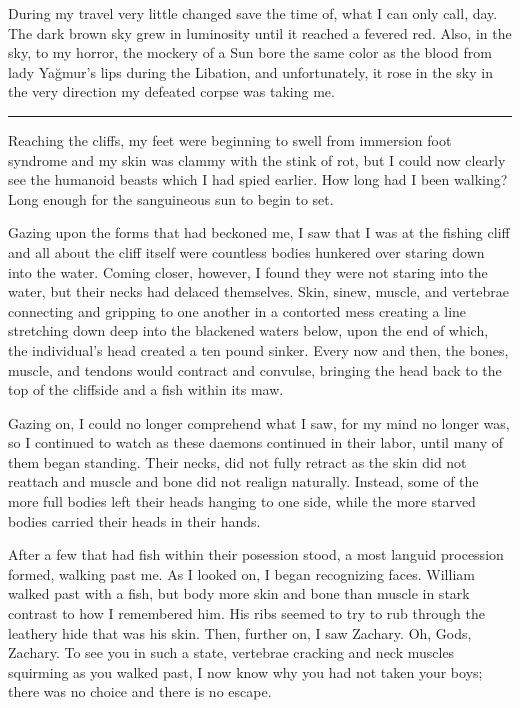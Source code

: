 During my travel very little changed save the time of, what I can only call, day. The dark
brown sky grew in luminosity until it reached a fevered red. Also, in the sky, to my horror, the
mockery of a Sun bore the same color as the blood from lady Yağmur's lips during the Libation, and
unfortunately, it rose in the sky in the very direction my defeated corpse was taking me.

\noindent\rule{\textwidth}{1pt}

Reaching the cliffs, my feet were beginning to swell from immersion foot syndrome and my skin was
clammy with the stink of rot, but I could now clearly see the humanoid beasts which I had spied
earlier. How long had I been walking? Long enough for the sanguineous sun to begin to set.

Gazing upon the forms that had beckoned me, I saw that I was at the fishing cliff and all about the
cliff itself were countless bodies hunkered over staring down into the water. Coming closer,
however, I found they were not staring into the water, but their necks had delaced themselves. Skin,
sinew, muscle, and vertebrae connecting and gripping to one another in a contorted mess creating a
line stretching down deep into the blackened waters below, upon the end of which, the individual's
head created a ten pound sinker. Every now and then, the bones, muscle, and tendons would contract
and convulse, bringing the head back to the top of the cliffside and a fish within its maw.

Gazing on, I could no longer comprehend what I saw, for my mind no longer was, so I continued to
watch as these daemons continued in their labor, until many of them began standing. Their necks, did
not fully retract as the skin did not reattach and muscle and bone did not realign naturally.
Instead, some of the more full bodies left their heads hanging to one side, while the more starved
bodies carried their heads in their hands.

After a few that had fish within their posession stood, a most languid procession formed, walking
past me. As I looked on, I began recognizing faces. William walked past with a fish, but body more
skin and bone than muscle in stark contrast to how I remembered him. His ribs seemed to try to rub
through the leathery hide that was his skin. Then, further on, I saw Zachary. Oh, Gods, Zachary. To
see you in such a state, vertebrae cracking and neck muscles squirming as you walked past, I now
know why you had not taken your boys; there was no choice and there is no escape.

